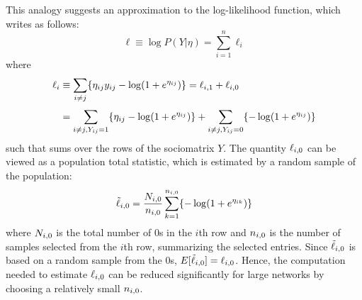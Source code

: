     This analogy suggests an approximation to the log-likelihood function, which \citeauthor*{raftery2012fast} writes as follows:
    \begin{equation}
    \label{eq:case-likelihood-approx}
        \ell \equiv \log P(Y|\eta)=\sum_{i=1}^n \ell_i
    \end{equation}
    where
    \begin{equation}
        \setlength{\jot}{0.5\baselineskip}
        \begin{split}
            \ell_i &\equiv \sum_{i\neq j}\{\sub(\eta)\sub(y)-\log(1+e^{\sub(\eta)})\} = \sub(\ell)(i,1) + \sub(\ell)(i,0)\\
            &= \sum_{i\neq j, \sub(Y)=1} \{\sub(\eta)-\log(1+e^{\sub(\eta)}) \} + \sum_{i\neq j, \sub(Y)=0} \{-\log(1+e^{\sub(\eta)}) \} \\
        \end{split}
    \end{equation}
    such that  sums over the rows of the sociomatrix $Y$. The quantity $\sub(\ell)(i,0)$ can be viewed as a population total statistic, which is estimated by a random sample of the population:
    \begin{equation}
        \sub(\tilde{\ell})(i,0)=\frac{\sub(N)(i,0)}{\sub(n)(i,0)} \sum_{k=1}^{\sub(n)(i,0)} \{ -\log(1+e^{\sub(\eta)(ik)}) \}
    \end{equation}
    where $\sub(N)(i,0)$ is the total number of 0s in the $i$th row and $\sub(n)(i,0)$ is the number of samples selected from the $i$th row, summarizing the selected entries. Since $\sub(\tilde{\ell})(i,0)$ is based on a random sample from the 0s, $E[\sub(\tilde{\ell})(i,0)] = \sub(\ell)(i,0)$. Hence, the computation needed to estimate $\sub(\ell)(i,0)$ can be reduced significantly for large networks by choosing a relatively small $\sub(n)(i,0)$.
    
